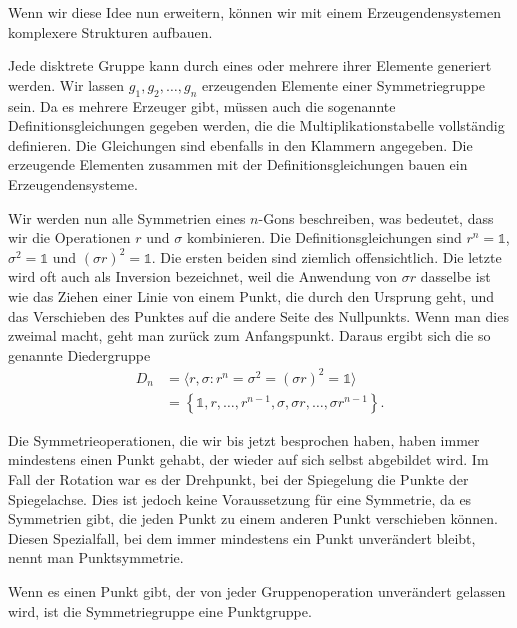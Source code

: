 Wenn wir diese Idee nun erweitern, können wir mit einem Erzeugendensystemen
komplexere Strukturen aufbauen.

\begin{definition}[Erzeugendensysteme]
  Jede disktrete Gruppe kann durch eines oder mehrere ihrer Elemente generiert werden.
  Wir lassen \(g_1, g_2, \ldots, g_n\) erzeugenden Elemente einer Symmetriegruppe sein.
  Da es mehrere Erzeuger gibt, müssen auch die sogenannte Definitionsgleichungen gegeben werden, die die Multiplikationstabelle vollständig definieren.
  Die Gleichungen sind ebenfalls in den Klammern angegeben.
  Die erzeugende Elementen zusammen mit der Definitionsgleichungen bauen ein Erzeugendensysteme.
\end{definition}
\begin{beispiel}
  Wir werden nun alle Symmetrien eines \(n\)-Gons beschreiben, was bedeutet, dass wir die Operationen \(r\) und \(\sigma\) kombinieren.
  Die Definitionsgleichungen sind \(r^n = \mathds{1}\), \(\sigma^2 = \mathds{1}\) und \((\sigma r)^2 = \mathds{1}\).
  Die ersten beiden sind ziemlich offensichtlich.
  Die letzte wird oft auch als Inversion bezeichnet, weil die Anwendung von \(\sigma r\) dasselbe ist wie das Ziehen einer Linie von einem Punkt, die durch den Ursprung geht, und das Verschieben des Punktes auf die andere Seite des Nullpunkts.
  Wenn man dies zweimal macht, geht man zurück zum Anfangspunkt.
  Daraus ergibt sich die so genannte Diedergruppe 
  \begin{align*}
    D_n &= \langle r, \sigma : r^n = \sigma^2 = (\sigma r)^2 = \mathds{1} \rangle \\
      &= \left\{
          \mathds{1}, r, \ldots, r^{n-1}, \sigma, \sigma r, \ldots, \sigma r^{n-1}
      \right\}.
  \end{align*}
\end{beispiel}

Die Symmetrieoperationen, die wir bis jetzt besprochen haben, haben immer mindestens einen Punkt gehabt, der wieder auf sich selbst abgebildet wird.
Im Fall der Rotation war es der Drehpunkt, bei der Spiegelung die Punkte der Spiegelachse.
Dies ist jedoch keine Voraussetzung für eine Symmetrie, da es Symmetrien gibt, die jeden Punkt zu einem anderen Punkt verschieben können.
 Diesen Spezialfall, bei dem immer mindestens ein Punkt unverändert bleibt, nennt man Punktsymmetrie.
\begin{definition}[Punktgruppe]
  Wenn es einen Punkt gibt, der von jeder Gruppenoperation unverändert gelassen wird, ist die Symmetriegruppe eine Punktgruppe.
\end{definition}


